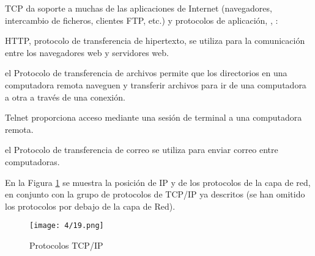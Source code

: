 TCP da soporte a muchas de las aplicaciones de Internet (navegadores, intercambio de ficheros, clientes FTP, etc.) y protocolos de aplicación, \cite{Peterson2021}, \cite{Forouzan2021} :
\begin{description} 
	\item[HTTP]   \gls{HTTP},  protocolo de transferencia de hipertexto,   se utiliza para la comunicación entre los navegadores web y servidores web.
	
	\item[FTP]  el Protocolo de transferencia de archivos permite que los directorios en una computadora remota naveguen y transferir archivos para ir de una computadora a otra a través de una conexión.
	
	\item[Telnet]  Telnet proporciona acceso mediante una sesión de terminal a una computadora remota.
	
	\item [SMTP] el Protocolo  de transferencia de correo se utiliza para enviar correo entre computadoras.
\end{description}

En la Figura \ref{fig:TCP-suite}  se muestra la posición de IP y de los protocolos de la capa de red, en conjunto con la grupo de protocolos  de TCP/IP ya descritos (se han omitido los protocolos por debajo de la capa de Red).


\begin{figure}  
	 \begin{center}
    \texttt{[image: 4/19.png]}
    \caption{Protocolos TCP/IP}
    \label{fig:TCP-suite}
\end{center}  
\end{figure}

